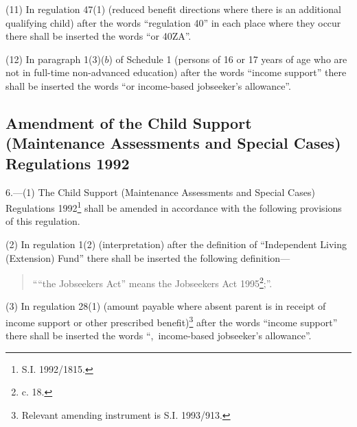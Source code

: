 \documentclass[a4paper]{article}
\begin{document}
(11) In regulation 47(1) (reduced benefit directions where there is an additional qualifying child) after the words “regulation 40” in each place where they occur there shall be inserted the words “or 40ZA”.

(12) In paragraph 1(3)($b$) of Schedule 1 (persons of 16 or 17 years of age who are not in full-time non-advanced education) after the words “income support” there shall be inserted the words “or income-based jobseeker’s allowance”.

\subsection[6. Amendment of the Child Support (Maintenance Assessments and Special Cases) Regulations 1992]{Amendment of the Child Support (Maintenance Assessments and Special Cases) Regulations 1992}

6.—(1) The Child Support (Maintenance Assessments and Special Cases) Regulations 1992\footnote{\frenchspacing S.I. 1992/1815.} shall be amended in accordance with the following provisions of this regulation.

(2) In regulation 1(2) (interpretation) after the definition of “Independent Living (Extension) Fund” there shall be inserted the following definition—
\begin{quotation}
““the Jobseekers Act” means the Jobseekers Act 1995\footnote{ c. 18.};”.
\end{quotation}

(3) In regulation 28(1) (amount payable where absent parent is in receipt of income support or other prescribed benefit)\footnote{\frenchspacing Relevant amending instrument is S.I. 1993/913.} after the words “income support” there shall be inserted the words “,~income-based jobseeker’s allowance”.
\end{document}
